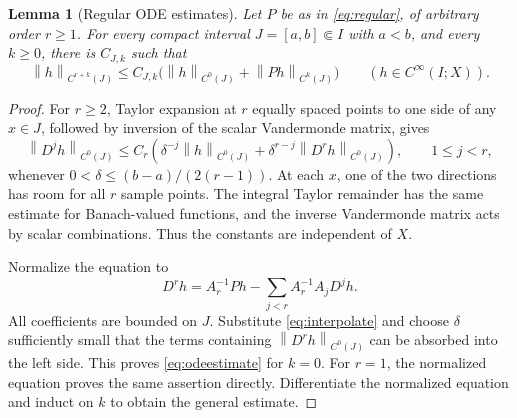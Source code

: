 \documentclass[11pt,reqno]{amsart}
\numberwithin{equation}{section}
\newtheorem{lemma}[theorem]{Lemma}
\theoremstyle{definition}
\theoremstyle{remark}
\newcommand{\norm}[1]{\left\lVert #1\right\rVert}
\begin{document}
\begin{lemma}[Regular ODE estimates]\label{lem:ode}
Let $P$ be as in \eqref{eq:regular}, of arbitrary order $r\ge1$. For every compact interval $J=[a,b]\Subset I$ with $a<b$, and every $k\ge0$, there is $C_{J,k}$ such that
\begin{equation}\label{eq:odeestimate}
 \norm{h}_{C^{r+k}(J)}
 \le C_{J,k}\bigl(\norm{h}_{C^0(J)}+\norm{Ph}_{C^k(J)}\bigr)
 \qquad(h\in C^\infty(I;X)).
\end{equation}
\end{lemma}
\begin{proof}
For $r\ge2$, Taylor expansion at $r$ equally spaced points to one side of any $x\in J$, followed by inversion of the scalar Vandermonde matrix, gives
\begin{equation}\label{eq:interpolate}
 \norm{D^jh}_{C^0(J)}
 \le C_r\left(\delta^{-j}\norm{h}_{C^0(J)}
              +\delta^{r-j}\norm{D^rh}_{C^0(J)}\right),
 \qquad 1\le j<r,
\end{equation}
whenever $0<\delta\le(b-a)/(2(r-1))$. At each $x$, one of the two directions has room for all $r$ sample points. The integral Taylor remainder has the same estimate for Banach-valued functions, and the inverse Vandermonde matrix acts by scalar combinations. Thus the constants are independent of $X$.

Normalize the equation to
\[
 D^rh=A_r^{-1}Ph-\sum_{j<r}A_r^{-1}A_jD^jh.
\]
All coefficients are bounded on $J$. Substitute \eqref{eq:interpolate} and choose $\delta$ sufficiently small that the terms containing $\norm{D^rh}_{C^0(J)}$ can be absorbed into the left side. This proves \eqref{eq:odeestimate} for $k=0$. For $r=1$, the normalized equation proves the same assertion directly. Differentiate the normalized equation and induct on $k$ to obtain the general estimate.
\end{proof}
\end{document}
